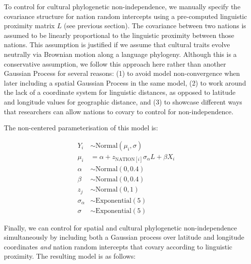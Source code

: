 \documentclass[
  man,floatsintext]{apa6}
\begin{document}
\newpage

To control for cultural phylogenetic non-independence, we manually specify the covariance structure for nation random intercepts using a pre-computed linguistic proximity matrix \(L\) (see previous section). The covariance between two nations is assumed to be linearly proportional to the linguistic proximity between those nations. This assumption is justified if we assume that cultural traits evolve neutrally via Brownian motion along a language phylogeny. Although this is a conservative assumption, we follow this approach here rather than another Gaussian Process for several reasons: (1) to avoid model non-convergence when later including a spatial Gaussian Process in the same model, (2) to work around the lack of a coordinate system for linguistic distances, as opposed to latitude and longitude values for geographic distance, and (3) to showcase different ways that researchers can allow nations to covary to control for non-independence.

The non-centered parameterisation of this model is:

\[
\begin{aligned}
Y_{i} &\sim \text{Normal}(\mu_{i},\sigma) \\
\mu_{i} &= \alpha + z_{\text{NATION}[i]}\sigma_{\alpha}L + \beta X_{i} \\
\alpha &\sim \text{Normal}(0, 0.4) \\
\beta &\sim \text{Normal}(0, 0.4) \\
z_{j} &\sim \text{Normal}(0, 1)\\
\sigma_{\alpha} &\sim \text{Exponential}(5) \\
\sigma &\sim \text{Exponential}(5)
\end{aligned}
\]
\newpage

Finally, we can control for spatial and cultural phylogenetic non-independence simultaneously by including both a Gaussian process over latitude and longitude coordinates \emph{and} nation random intercepts that covary according to linguistic proximity. The resulting model is as follows:
\end{document}
